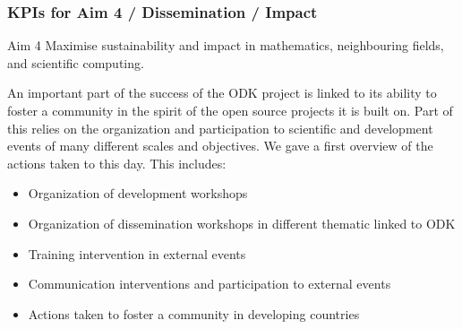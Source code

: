 \subsubsection{KPIs for Aim 4 / Dissemination / Impact}
\begin{recommendation}{Aim 4}
  Maximise sustainability and impact in mathematics, neighbouring fields, and scientific computing.
 \end{recommendation}

An important part of the success of the ODK project is linked to its ability to foster a community in the spirit of the open source projects 
it is built on. Part of this relies on the organization and participation to scientific and development events of many different scales and 
objectives. We gave a first overview of the actions taken to this day. This includes:

 \begin{itemize}
    \item Organization of development workshops
    \item Organization of dissemination workshops in different thematic linked to ODK
    \item Training intervention in external events
    \item Communication interventions and participation to external events
    \item Actions taken to foster a community in developing countries
    \end{itemize}

